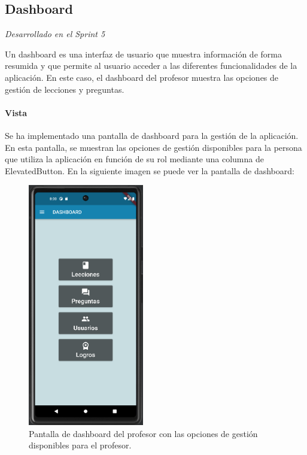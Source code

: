 \subsection{Dashboard}

\textit{Desarrollado en el Sprint 5}
\label{sec:dashboard}

Un dashboard es una interfaz de usuario que muestra información de forma resumida y que permite al usuario acceder a las diferentes funcionalidades de la aplicación. En este caso, el dashboard del profesor muestra las opciones de gestión de lecciones y preguntas.

\paragraph*{Vista}
Se ha implementado una pantalla de dashboard para la gestión de la aplicación. En esta pantalla, se muestran las opciones de gestión disponibles para la persona que utiliza la aplicación en función de su rol mediante una columna de ElevatedButton. En la siguiente imagen se puede ver la pantalla de dashboard:

\begin{figure}[H]
  \centering
  \includegraphics[width=0.45\textwidth]{imagenes/c7/dashboard.png}
  \caption{Pantalla de dashboard del profesor con las opciones de gestión disponibles para el profesor.}
  \label{fig:login}
\end{figure}

